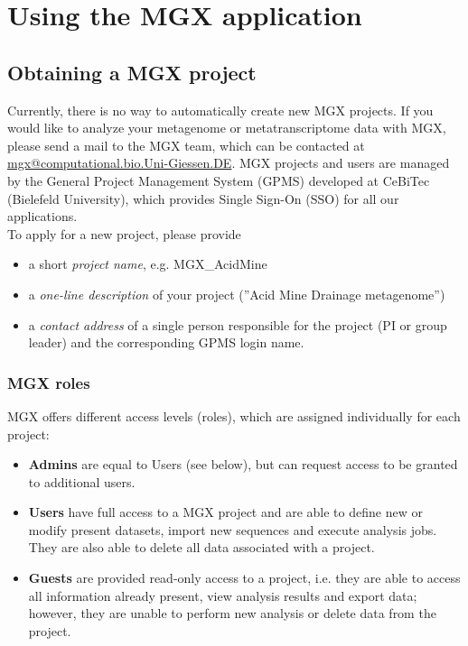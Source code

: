 
\chapter{Using the MGX application}
\label{using}


\section{Obtaining a MGX project}

Currently, there is no way to automatically create new MGX projects. If you would like to
analyze your metagenome or metatranscriptome data with MGX, please send a mail to the MGX team,
which can be contacted at \href{mailto:mgx@computational.bio.Uni-Giessen.DE}{mgx@computational.bio.Uni-Giessen.DE}.
MGX projects and users are managed by the General Project Management System (GPMS) developed at CeBiTec (Bielefeld
University), which provides Single Sign-On (SSO) for all our applications.\\

\noindent
To apply for a new project, please provide

\begin{itemize}
  \item a short \textit{project name}, e.g. MGX\_AcidMine
  \item a \textit{one-line description} of your project (''Acid Mine Drainage metagenome'')
  \item a \textit{contact address} of a single person responsible for the project (PI or group leader)
and the corresponding GPMS login name.
\end{itemize}


\subsection{MGX roles}

MGX offers different access levels (roles), which are assigned individually for each
project: \\

\begin{itemize}
  \item{\textbf{Admins} are equal to Users (see below), but can request access to be granted to additional users.}
  \item \textbf{Users} have full access to a MGX project and are able to define new or modify
present datasets, import new sequences and execute analysis jobs. They are also able to
delete all data associated with a project.
  \item \textbf{Guests} are provided read-only access to a project, i.e. they are able to access
all information already present, view analysis results and export data; however, they are
unable to perform new analysis or delete data from the project.
\end{itemize}

